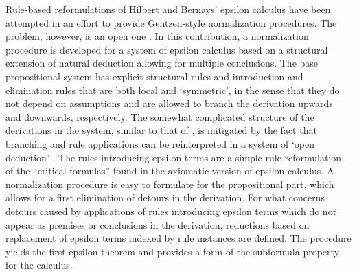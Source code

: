 \documentclass[bsl,meeting]{asl}
\newcommand{\NP}{}
\begin{document}
\thispagestyle{empty}


\NP  
{}



Rule-based reformulations of Hilbert and Bernays' epsilon calculus have been attempted in an effort to provide Gentzen-style normalization procedures. The problem, however, is an open one \cite{Zac17}. In this contribution, a normalization procedure is developed for a system of epsilon calculus based on a structural extension of natural deduction allowing for multiple conclusions. The base propositional system has explicit structural rules and introduction and elimination rules that are both local and `symmetric', in the sense that they do not depend on assumptions and are allowed to branch the derivation upwards and downwards, respectively. The somewhat complicated structure of the derivations in the system, similar to that of \cite{Ung92}, is mitigated by the fact that branching and rule applications can be reinterpreted in a system of `open deduction' \cite{GGP10}. The rules introducing epsilon terms are a simple rule reformulation of the ``critical formulas'' found in the axiomatic version of epsilon calculus.  A normalization procedure is easy to formulate for the propositional part, which allows for a first elimination of detours in the derivation. For what concerns detours caused by applications of rules introducing epsilon terms which do not appear as premises or conclusions in the derivation, reductions based on replacement of epsilon terms indexed by rule instances are defined. The procedure yields the first epsilon theorem and provides a form of the subformula property for the calculus.
\end{document}
